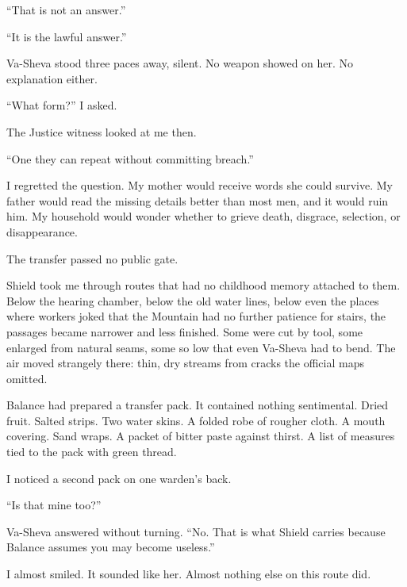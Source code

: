 ``That is not an answer.''\par

``It is the lawful answer.''\par

Va-Sheva stood three paces away, silent. No weapon showed on her. No explanation either.\par

``What form?'' I asked.\par

The Justice witness looked at me then.\par

``One they can repeat without committing breach.''\par

I regretted the question. My mother would receive words she could survive. My father would read the missing details better than most men, and it would ruin him. My household would wonder whether to grieve death, disgrace, selection, or disappearance.\par

The transfer passed no public gate.\par

Shield took me through routes that had no childhood memory attached to them. Below the hearing chamber, below the old water lines, below even the places where workers joked that the Mountain had no further patience for stairs, the passages became narrower and less finished. Some were cut by tool, some enlarged from natural seams, some so low that even Va-Sheva had to bend. The air moved strangely there: thin, dry streams from cracks the official maps omitted.\par

Balance had prepared a transfer pack. It contained nothing sentimental. Dried fruit. Salted strips. Two water skins. A folded robe of rougher cloth. A mouth covering. Sand wraps. A packet of bitter paste against thirst. A list of measures tied to the pack with green thread.\par

I noticed a second pack on one warden's back.\par

``Is that mine too?''\par

Va-Sheva answered without turning. ``No. That is what Shield carries because Balance assumes you may become useless.''\par

I almost smiled. It sounded like her. Almost nothing else on this route did.\par

